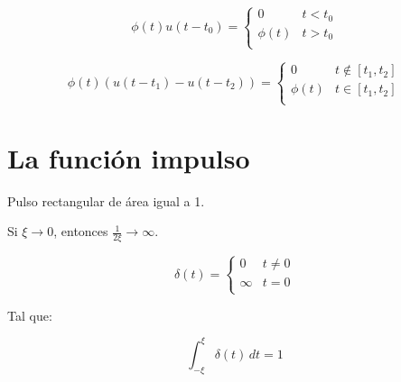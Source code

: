 \begin{equation*}
    \phi(t)u(t-t_0)=\begin{cases}
        0       & t<t_0\\
        \phi(t) & t>t_0\\
    \end{cases}
\end{equation*}

\begin{figure}[H]
    \centering
    
\end{figure}

\begin{equation*}
    \phi(t)(u(t-t_1)-u(t-t_2))=\begin{cases}
        0       & t\notin[t_1,t_2]\\
        \phi(t) & t\in[t_1,t_2]\\
    \end{cases}
\end{equation*}

\begin{figure}[H]
    \centering
    
\end{figure}

\section{La función impulso}
Pulso rectangular de área igual a 1.

\begin{figure}[H]
    \centering
    
\end{figure}

Si $\xi\to0$, entonces $\frac{1}{2\xi}\to\infty$.

\begin{figure}[H]
    \centering
    
\end{figure}

\begin{equation*}
    \delta(t)=\begin{cases}
        0      & t\neq0\\
        \infty & t=0\\
    \end{cases}
\end{equation*}

Tal que:

\begin{equation*}
    \int_{-\xi}^{\xi} \delta(t)\,dt=1
\end{equation*}

